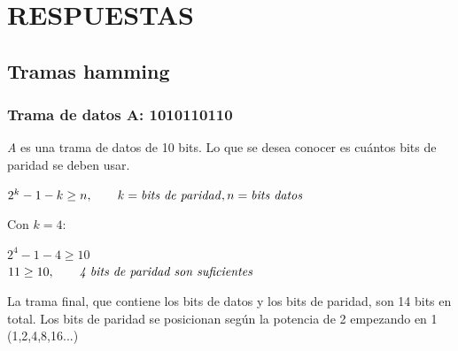 \section{RESPUESTAS}
\subsection{Tramas hamming}
\subsubsection{Trama de datos A: 1010110110}
\noindent{} \textit{A} es una trama de datos de 10 bits. Lo que se desea conocer es cuántos bits de paridad se deben usar.
\begin{center}\Large
    $2^k - 1 - k \geq n,\qquad{} k = \text{\textit{bits de paridad}}, n = \text{\textit{bits datos}}$
\end{center}
\noindent{} Con $k=4$:
\begin{center}\Large
    $2^4 - 1 - 4 \geq 10$ \\[5pt]
    $11 \geq 10,\qquad\text{\textit{4 bits de paridad son suficientes}}$
\end{center}
\sangria{} La trama final, que contiene los bits de datos y los bits de paridad, son 14 bits en total. Los bits de paridad se posicionan según la potencia de 2 empezando en 1 (1,2,4,8,16...)
